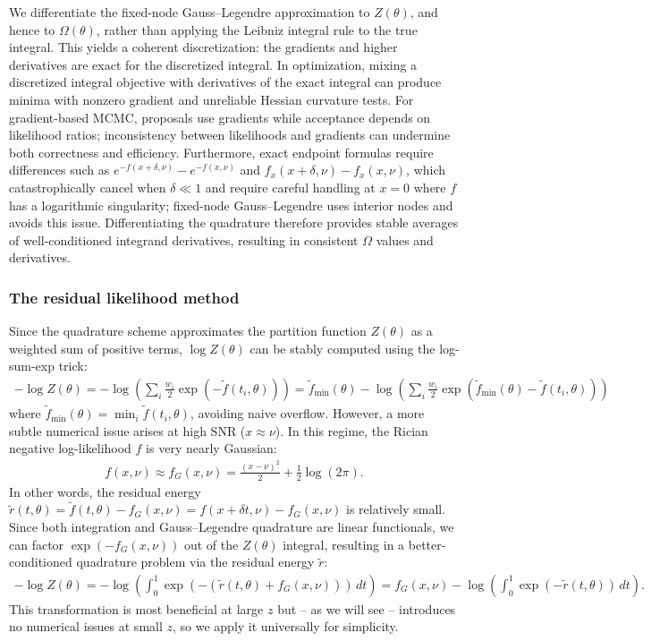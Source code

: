 \documentclass{article}
\begin{document}
We differentiate the fixed-node Gauss--Legendre approximation to $Z(\theta)$, and hence to $\Omega(\theta)$, rather than applying the Leibniz integral rule to the true integral.
This yields a coherent discretization: the gradients and higher derivatives are exact for the discretized integral.
In optimization, mixing a discretized integral objective with derivatives of the exact integral can produce minima with nonzero gradient and unreliable Hessian curvature tests.
For gradient-based MCMC, proposals use gradients while acceptance depends on likelihood ratios; inconsistency between likelihoods and gradients can undermine both correctness and efficiency.
Furthermore, exact endpoint formulas require differences such as $e^{-f(x+\delta,\nu)} - e^{-f(x,\nu)}$ and $f_x(x+\delta,\nu) - f_x(x,\nu)$, which catastrophically cancel when $\delta \ll 1$ and require careful handling at $x=0$ where $f$ has a logarithmic singularity; fixed-node Gauss--Legendre uses interior nodes and avoids this issue.
Differentiating the quadrature therefore provides stable averages of well-conditioned integrand derivatives, resulting in consistent $\Omega$ values and derivatives.

\subsubsection{The residual likelihood method}

Since the quadrature scheme approximates the partition function $Z(\theta)$ as a weighted sum of positive terms, $\log Z(\theta)$ can be stably computed using the log-sum-exp trick:
%
\begin{align}
  -\log Z(\theta)
  = -\log\left(\sum_i \frac{w_i}{2} \exp(-\tilde{f}(t_i, \theta))\right)
  = \tilde{f}_{\min}(\theta) - \log\left(\sum_i \frac{w_i}{2} \exp(\tilde{f}_{\min}(\theta) - \tilde{f}(t_i, \theta))\right)
\end{align}
%
where $\tilde{f}_{\min}(\theta) = \min_i \tilde{f}(t_i, \theta)$, avoiding naive overflow.
However, a more subtle numerical issue arises at high SNR ($x \approx \nu$).
In this regime, the Rician negative log-likelihood $f$ is very nearly Gaussian:
%
\begin{align}
  f(x, \nu) \approx f_G(x,\nu) = \frac{(x-\nu)^2}{2} + \frac{1}{2}\log(2\pi).
\end{align}
%
In other words, the residual energy $\tilde{r}(t,\theta) = \tilde{f}(t,\theta) - f_G(x,\nu) = f(x + \delta t, \nu) - f_G(x,\nu)$ is relatively small.
Since both integration and Gauss--Legendre quadrature are linear functionals, we can factor $\exp(-f_G(x,\nu))$ out of the $Z(\theta)$ integral, resulting in a better-conditioned quadrature problem via the residual energy $\tilde{r}$:
%
\begin{align}
  -\log Z(\theta)
  = - \log\left(\int_0^1 \exp(-(\tilde{r}(t,\theta) + f_G(x,\nu))) \, dt \right)
  = f_G(x,\nu) - \log\left(\int_0^1 \exp(-\tilde{r}(t,\theta)) \, dt \right). \label{eq:logz-residual-derivation}
\end{align}
%
This transformation is most beneficial at large $z$ but -- as we will see -- introduces no numerical issues at small $z$, so we apply it universally for simplicity.
\end{document}
